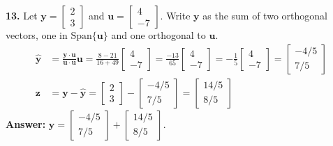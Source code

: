 \documentclass[11pt, letterpaper]{article}
\theoremstyle{definition}
\theoremstyle{remark}
\begin{document}
\textbf{13.} Let $\mathbf{y} = \begin{bmatrix} 2 \\ 3 \end{bmatrix}$ and $\mathbf{u} = \begin{bmatrix} 4 \\ -7 \end{bmatrix}$. Write $\mathbf{y}$ as the sum of two orthogonal vectors, one in $\text{Span}\{\mathbf{u}\}$ and one orthogonal to $\mathbf{u}$.
\begin{align*}
    \hat{\mathbf{y}} &= \frac{\mathbf{y} \cdot \mathbf{u}}{\mathbf{u} \cdot \mathbf{u}} \mathbf{u} = \frac{8 - 21}{16 + 49} \begin{bmatrix} 4 \\ -7 \end{bmatrix} = \frac{-13}{65} \begin{bmatrix} 4 \\ -7 \end{bmatrix} = -\frac{1}{5} \begin{bmatrix} 4 \\ -7 \end{bmatrix} = \begin{bmatrix} -4/5 \\ 7/5 \end{bmatrix} \\
    \mathbf{z} &= \mathbf{y} - \hat{\mathbf{y}} = \begin{bmatrix} 2 \\ 3 \end{bmatrix} - \begin{bmatrix} -4/5 \\ 7/5 \end{bmatrix} = \begin{bmatrix} 14/5 \\ 8/5 \end{bmatrix}
\end{align*}
\textbf{Answer:} $\mathbf{y} = \begin{bmatrix} -4/5 \\ 7/5 \end{bmatrix} + \begin{bmatrix} 14/5 \\ 8/5 \end{bmatrix}$.
\end{document}

